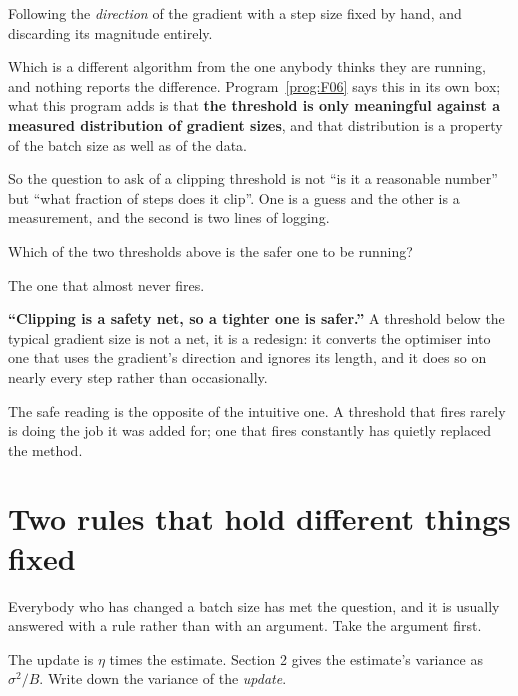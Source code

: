 \begin{fr}
\begin{ansblock}
Following the \emph{direction} of the gradient with a step size fixed by hand,
and discarding its magnitude entirely.
\end{ansblock}

Which is a different algorithm from the one anybody thinks they are running,
and nothing reports the difference. Program~\ref{prog:F06} says this in its own
box; what this program adds is that \textbf{the threshold is only meaningful
against a measured distribution of gradient sizes}, and that distribution is a
property of the batch size as well as of the data.

So the question to ask of a clipping threshold is not \enquote{is it a
reasonable number} but \enquote{what fraction of steps does it clip}. One is a
guess and the other is a measurement, and the second is two lines of logging.

Which of the two thresholds above is the safer one to be running?
\nextframe
\end{fr}

\begin{fr}
\begin{ansblock}
The one that almost never fires.
\end{ansblock}

\begin{trapbox}
\textbf{\enquote{Clipping is a safety net, so a tighter one is safer.}} A
threshold below the typical gradient size is not a net, it is a redesign: it
converts the optimiser into one that uses the gradient's direction and ignores
its length, and it does so on nearly every step rather than occasionally.

The safe reading is the opposite of the intuitive one. A threshold that fires
rarely is doing the job it was added for; one that fires constantly has
quietly replaced the method.
\end{trapbox}
\end{fr}

\section{Two rules that hold different things fixed}
\label{sec:P21-scaling}

\begin{fr}
Everybody who has changed a batch size has met the question, and it is usually
answered with a rule rather than with an argument. Take the argument first.

The update is $\eta$ times the estimate. Section 2 gives the estimate's
variance as $\sigma^{2}/B$. Write down the variance of the \emph{update}.
\dotline
\nextframe
\end{fr}


